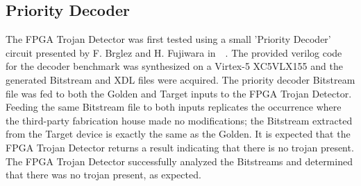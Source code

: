 \documentclass[journal, hidelinks]{IEEEtran}
\begin{document}
\subsection{Priority Decoder} \label{sec:priorityDecoder}
The FPGA Trojan Detector was first tested using a small 'Priority Decoder' circuit presented by F. Brglez and H. Fujiwara
in~~\cite{iscas85}.
The provided verilog code for the decoder benchmark was synthesized on a Virtex-5 XC5VLX155 and the generated Bitstream and XDL files were acquired.
The priority decoder Bitstream file was fed to both the Golden and Target inputs to the FPGA Trojan Detector.
Feeding the same Bitstream file to both inputs replicates the occurrence where the third-party fabrication house made no modifications; the Bitstream extracted from the Target device is exactly the same as the Golden.
It is expected that the FPGA Trojan Detector returns a result indicating that there is no trojan present.
The FPGA Trojan Detector successfully analyzed the Bitstreams and determined that there was no trojan present, as expected.
\end{document}
